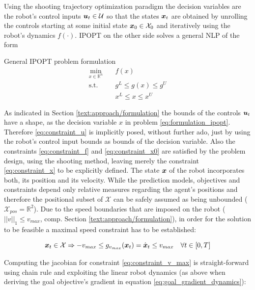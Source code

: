 Using the shooting trajectory optimization paradigm the decision variables are the robot's control inputs  $\boldsymbol{u}_t \in \mathcal{U}$ so that the states $\boldsymbol{x}_t$ are obtained by unrolling the controls starting at some initial state $\boldsymbol{x}_0 \in \mathcal{X}_0$ and iteratively using the robot's dynamics $f(\cdot)$. \ac{IPOPT} on the other side solves a general \ac{NLP} of the form \cite{Wachter2006} \\

\begin{problem}{General IPOPT problem formulation}
\begin{align}
\min_{x \in \mathbb{R}^n} \quad & f(x) \\
\textrm{s.t. } \quad & g^L \leq g(x) \leq g^U \\
& x^L \leq x \leq x^U 
\end{align}
\label{eq:formulation_ipopt}
\end{problem}

As indicated in Section \ref{text:approach/formulation} the bounds of the controls $\boldsymbol{u}_t$ have a shape, as the decision variable $x$ in problem \ref{eq:formulation_ipopt}. Therefore \ref{eq:constraint_u} is implicitly posed, without further ado, just by using the robot's control input bounds as bounds of the decision variable. Also the constraints \ref{eq:constraint_f} and  \ref{eq:constraint_x0} are satisfied by the problem design, using the shooting method, leaving merely the constraint \ref{eq:constraint_x} to be explicitly defined. The state $\boldsymbol{x}$ of the robot incorporates both, its position and its velocity. While the prediction models, objectives and constraints depend only  relative measures regarding the agent's positions and therefore the positional subset of $\mathcal{X}$ can be safely assumed as being unbounded ($\mathcal{X}_{pos} = \mathbb{R}^2$). Due to the speed boundaries that are imposed on the robot ($||v||_1 \leq v_{max}$, comp. Section \ref{text:approach/formulation}), in order for the solution to be feasible a maximal speed constraint has to be established:

\begin{equation}
\boldsymbol{x}_t \in \mathcal{X} \Rightarrow -v_{max} \leq g_{v_{max}}(\boldsymbol{x}_t) = \dot{\boldsymbol{x}}_t \leq v_{max} \quad \forall t \in [0, T]
\label{eq:constraint_v_max}
\end{equation}

Computing the jacobian for constraint \ref{eq:constraint_v_max} is straight-forward using chain rule and exploiting the linear robot dynamics (as above when deriving the goal objective's gradient in equation \ref{eq:goal_gradient_dynamics}):  

